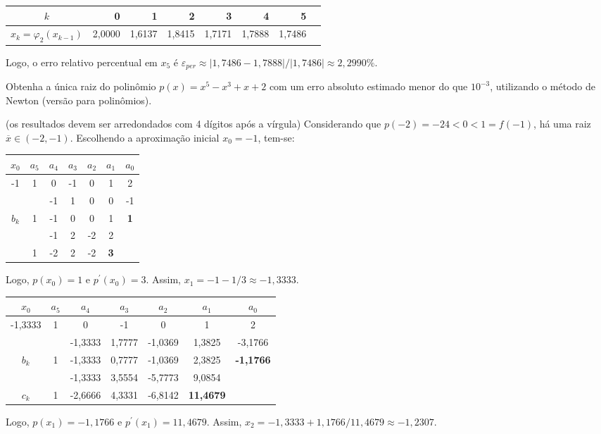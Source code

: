 \documentclass[12pt,a4paper]{article}
\begin{document}
\begin{ExerciseList}
\begin{enumerate}
\begin{center}
\begin{tabular}{|c|r|r|r|r|r|r|r|}
\hline
$k$   & 0      & 1      & 2      & 3      & 4      & 5 \\ \hline
$x_k = \varphi_2(x_{k-1})$ & 2,0000 & 1,6137 & 1,8415 & 1,7171 & 1,7888 & 1,7486 \\ \hline
\end{tabular}
\end{center}
Logo, o erro relativo percentual em $x_5$ é $\varepsilon_{per} \approx |1,7486 - 1,7888 |/|1,7486| \approx 2,2990\%$.
\end{enumerate}

\Exercise[title={2,5}] Obtenha a única raiz do polinômio $p(x) = x^5-x^3+x+2$ com um erro absoluto estimado menor do que $10^{-3}$, utilizando o método de Newton (versão para polinômios).

(os resultados devem ser arredondados com 4 dígitos após a vírgula)
\Answer Considerando que $p(-2) = -24 < 0 < 1 = f(-1)$, há uma raiz $\overline{x} \in (-2, -1)$. Escolhendo a aproximação inicial $x_0 = -1$, tem-se:
\begin{center}
\begin{tabular}{|c|c|c|c|c|c|c|}
\hline
$x_0$ & $a_5$ & $a_4$ & $a_3$ & $a_2$ & $a_1$ & $a_0$ \\
\hline
-1 & 1 &  0 & -1 &  0 & 1 &  2 \\
\hline
   &   & -1 &  1 &  0 & 0 & -1 \\
\hline
$b_k$  &  1 & -1 &  0 & 0 & 1 & \textbf{1} \\
\hline
   &   & -1 &  2 & -2 & 2 & \\
\hline
   & 1 & -2 &  2 & -2 & \textbf{3} & \\
\hline
\end{tabular}
\end{center}
Logo, $p(x_0) = 1$ e $p^\prime(x_0) = 3$. Assim, $x_1 = -1 - 1/3 \approx -1,3333$.

\begin{center}
\begin{tabular}{|c|c|c|c|c|c|c|}
\hline
$x_0$ & $a_5$ & $a_4$ & $a_3$ & $a_2$ & $a_1$ & $a_0$ \\
\hline
-1,3333 & 1 & 0 & -1 & 0 & 1 & 2 \\
\hline
 &   & -1,3333 & 1,7777 & -1,0369 & 1,3825 & -3,1766 \\
\hline
$b_k$ & 1 & -1,3333 & 0,7777 & -1,0369 & 2,3825 & \textbf{-1,1766} \\
\hline
 &   & -1,3333 & 3,5554 & -5,7773 & 9,0854 &   \\
\hline
$c_k$ & 1 & -2,6666 & 4,3331 & -6,8142 & \textbf{11,4679} & \\
\hline
\end{tabular}
\end{center}
Logo, $p(x_1) = -1,1766$ e $p^\prime(x_1) = 11,4679$. Assim, $x_2 = -1,3333 +1,1766/11,4679 \approx -1,2307$.


\end{ExerciseList}
\end{document}
